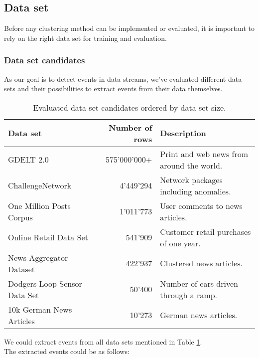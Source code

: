 \subsection{Data set}

Before any clustering method can be implemented or evaluated,
it is important to rely on the right data set for training and evaluation.

\iffalse
As our goal is to detect events in news data streams, we've looked for data sets containing
news articles and if possible, if they're somehow assigned to a \textit{story}.
A story, for example, could be \textit{Brexit}.
Any new news article writing about \textit{Brexit} would be a new event in this story.
\fi

\subsubsection{Data set candidates}
As our goal is to detect events in data streams, we've evaluated different data sets and
their possibilities to extract events from their data themselves.

\begin{table}[h]
    \centering
    \begin{tabular}{|l|r|l|}
    \hline
    \textbf{Data set} & \textbf{Number of rows} & \textbf{Description} \\ \hline
    GDELT 2.0 & 575'000'000+ & Print and web news from around the world. \\ \hline
    ChallengeNetwork & 4'449'294 & Network packages including anomalies. \\ \hline
    One Million Posts Corpus & 1'011'773 & User comments to news articles. \\ \hline
    Online Retail Data Set & 541'909 & Customer retail purchases of one year. \\ \hline
    News Aggregator Dataset & 422'937 & Clustered news articles. \\ \hline
    Dodgers Loop Sensor Data Set & 50'400 & Number of cars driven through a ramp. \\ \hline
    10k German News Articles & 10'273 & German news articles. \\ \hline
    \end{tabular}
    \caption{Evaluated data set candidates ordered by data set size.}
    \label{tab:data_set_candidates}
\end{table}

We could extract events from all data sets mentioned in Table \ref{tab:data_set_candidates}.\\
The extracted events could be as follows:

